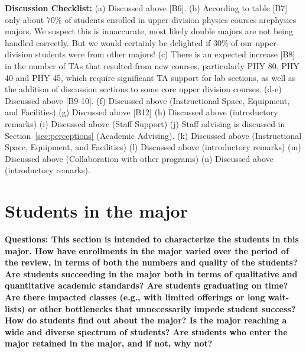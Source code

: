 \documentclass[12pt]{article}
\begin{document}
\noindent
{\bf Discussion Checklist:} (a) Discussed above [B6].  (b) According
to table [B7] only about $70\%$ of students enrolled in upper division
physics courses arephysics majors.  We suspect this is innaccurate,
most likely double majors are not being handled correctly.  But we
would certainly be delighted if 30\% of our upper-division students
were from other majors! (c) There is an expected increase [B8] in the
number of TAs that resulted from new courses, particularly PHY 80, PHY
40 and PHY 45, which require significant TA support for lab sections,
as well as the addition of discussion sections to some core upper
division courses.  (d-e) Discussed above [B9-10]. (f) Discussed above
(Instructional Space, Equipment, and Facilities) (g) Discussed above
[B12] (h) Discussed above (introductory remarks) (i) Discussed above
(Staff Support) (j) Staff advising is discussed in
Section~\ref{sec:perceptions} (Academic Advising).  (k) Discussed
above (Instructional Space, Equipment, and Facilities) (l) Discussed
above (introductory remarks) (m) Discussed above (Collaboration with
other programs) (n) Discussed above (introductory remarks).

\newpage
\section{Students in the major}
\label{sec:students}

{\bf Questions: This section is intended to characterize the students in this major. How have 
enrollments in the major varied over the period of the review, in terms of both the numbers 
and quality of the students? Are students succeeding in the major both in terms of qualitative 
and quantitative academic standards? Are students graduating on time? Are there impacted 
classes (e.g., with limited offerings or long wait-lists) or other bottlenecks that 
unnecessarily impede student success? How do students find out about the major?  Is the major 
reaching a wide and diverse spectrum of students? Are students who enter the major retained in 
the major, and if not, why not?}\\[3pt]
\end{document}
